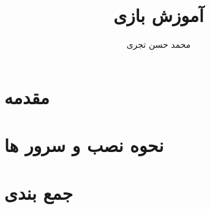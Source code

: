 \documentclass{report}
\title{{\Huge آموزش بازی \lr{dungeon crawl stone soup}}}
\author{{\LARGE محمد حسن تجری}}
\date{{\LARGE}}
\begin{document}
\maketitle

\begin{persian}

  \tableofcontents

  \chapter*{مقدمه}

  \chapter*{نحوه نصب و سرور ها}

  

  

  

  

  

  

  

  

  

  

  

  
  
  \chapter*{جمع بندی}

\end{persian}
\end{document}
